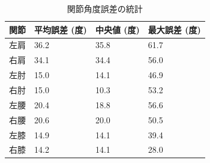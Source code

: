 \begin{table}[h]
\centering
\caption{関節角度誤差の統計}
\label{tab:joint_angle_error}
\begin{tabular}{llll}
\toprule
関節 & 平均誤差 (度) & 中央値 (度) & 最大誤差 (度) \\
\midrule
左肩 & 36.2 & 35.8 & 61.7 \\
右肩 & 34.1 & 34.4 & 56.0 \\
左肘 & 15.0 & 14.1 & 46.9 \\
右肘 & 15.0 & 10.3 & 53.2 \\
左腰 & 20.4 & 18.8 & 56.6 \\
右腰 & 20.6 & 20.0 & 50.5 \\
左膝 & 14.9 & 14.1 & 39.4 \\
右膝 & 14.2 & 14.1 & 28.0 \\
\bottomrule
\end{tabular}
\end{table}
